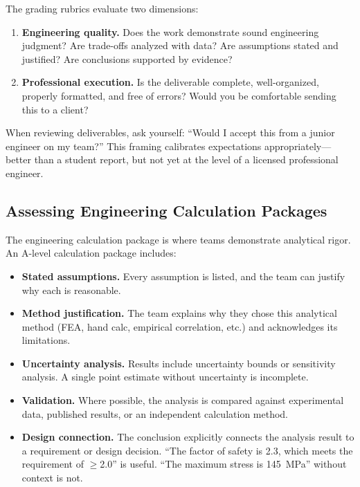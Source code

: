 The grading rubrics evaluate two dimensions:

\begin{enumerate}[nosep,leftmargin=1.5em]
\item \textbf{Engineering quality.} Does the work demonstrate sound engineering judgment? Are trade-offs analyzed with data? Are assumptions stated and justified? Are conclusions supported by evidence?
\item \textbf{Professional execution.} Is the deliverable complete, well-organized, properly formatted, and free of errors? Would you be comfortable sending this to a client?
\end{enumerate}

\begin{bestpractice}
When reviewing deliverables, ask yourself: ``Would I accept this from a junior engineer on my team?'' This framing calibrates expectations appropriately---better than a student report, but not yet at the level of a licensed professional engineer.
\end{bestpractice}

\subsection{Assessing Engineering Calculation Packages}

The engineering calculation package is where teams demonstrate analytical rigor. An A-level calculation package includes:

\begin{itemize}[nosep,leftmargin=1.5em]
\item \textbf{Stated assumptions.} Every assumption is listed, and the team can justify why each is reasonable.
\item \textbf{Method justification.} The team explains why they chose this analytical method (FEA, hand calc, empirical correlation, etc.) and acknowledges its limitations.
\item \textbf{Uncertainty analysis.} Results include uncertainty bounds or sensitivity analysis. A single point estimate without uncertainty is incomplete.
\item \textbf{Validation.} Where possible, the analysis is compared against experimental data, published results, or an independent calculation method.
\item \textbf{Design connection.} The conclusion explicitly connects the analysis result to a requirement or design decision. ``The factor of safety is 2.3, which meets the requirement of $\geq$2.0'' is useful. ``The maximum stress is 145~MPa'' without context is not.
\end{itemize}

